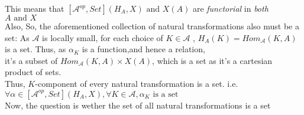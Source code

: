 \documentclass[18pt,a4paper]{extarticle}
\theoremstyle{definition}
\theoremstyle{definition}
\begin{document}
This means that $[ \mathcal{A}^{op},Set](H_A,X) \text{ and } X(A)$ are
\textit{functorial} in \textit{both} $A \text{ and } X$\\

Also,
So, the aforementioned collection of natural transformations also must be a set:
As $\mathcal{A} $ is locally small, for each choice of $K \in \mathcal{A} $ , $H_A(K)=Hom_{\mathcal{A}}(K,A)$ is a set.
Thus, as $\alpha_K $ is a function,and hence a relation,\\ it's a subset of $Hom_{\mathcal{A} }(K,A)\times X(A)$, which is a set as it's a cartesian product of sets.\\
Thus, $K$-component of every natural transformation is a set. i.e. $\forall \alpha \in [ \mathcal{A}^{op},Set](H_A,X), \forall K \in \mathcal{A}, \alpha_K \text{ is a set}$ \\

Now, the question is wether the set of all natural transformations is a set
\end{document}
